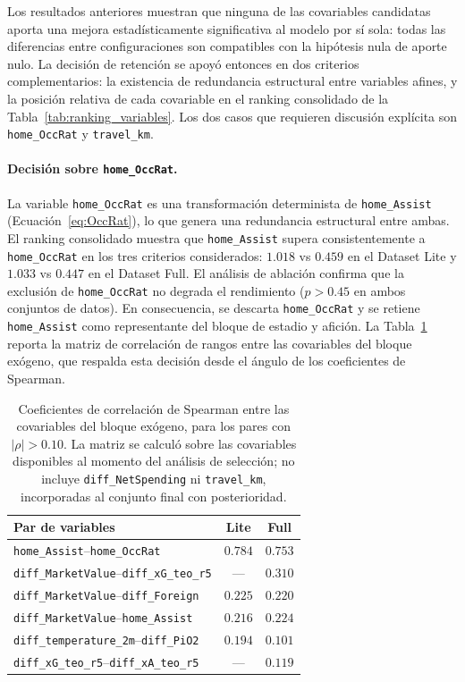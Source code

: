 Los resultados anteriores muestran que ninguna de las covariables candidatas aporta una mejora estad\'isticamente significativa al modelo por s\'i sola: todas las diferencias entre configuraciones son compatibles con la hip\'otesis nula de aporte nulo. La decisi\'on de retenci\'on se apoy\'o entonces en dos criterios complementarios: la existencia de redundancia estructural entre variables afines, y la posici\'on relativa de cada covariable en el ranking consolidado de la Tabla~\ref{tab:ranking_variables}. Los dos casos que requieren discusi\'on expl\'icita son \texttt{home\_OccRat} y \texttt{travel\_km}.

\paragraph{Decisi\'on sobre \texttt{home\_OccRat}.} La variable 
\texttt{home\_OccRat} es una transformaci\'on determinista de \texttt{home\_Assist} (Ecuaci\'on~\ref{eq:OccRat}), lo que genera una redundancia estructural entre ambas. El ranking consolidado muestra que \texttt{home\_Assist} supera consistentemente a \texttt{home\_OccRat} en los tres criterios considerados: $1{.}018$ vs $0{.}459$ en el Dataset Lite y $1{.}033$ vs $0{.}447$ en el Dataset Full. El an\'alisis de ablaci\'on confirma que la exclusi\'on de \texttt{home\_OccRat} no degrada el rendimiento ($p > 0.45$ en ambos conjuntos de datos). En consecuencia, se descarta \texttt{home\_OccRat} y se retiene \texttt{home\_Assist} como representante del bloque de estadio y afici\'on. La Tabla~\ref{tab:correlacion_spearman} reporta la matriz de correlaci\'on de rangos entre las covariables del bloque ex\'ogeno, que respalda esta decisi\'on desde el \'angulo de los coeficientes de Spearman.

\begin{table}[htbp]
	\centering
	\caption{Coeficientes de correlaci\'on de Spearman entre las covariables del bloque ex\'ogeno, para los pares con $|\rho| > 0{.}10$. La matriz se calcul\'o sobre las covariables disponibles al momento del an\'alisis de selecci\'on; no incluye \texttt{diff\_NetSpending} ni \texttt{travel\_km}, incorporadas al conjunto final con posterioridad.}
	\label{tab:correlacion_spearman}
	\begin{tabular}{lcc}
		\toprule
		\textbf{Par de variables} & \textbf{Lite} & \textbf{Full} \\
		\midrule
		\texttt{home\_Assist}--\texttt{home\_OccRat} & $0{.}784$ & $0{.}753$ \\
		\texttt{diff\_MarketValue}--\texttt{diff\_xG\_teo\_r5} & --- & $0{.}310$ \\
		\texttt{diff\_MarketValue}--\texttt{diff\_Foreign} & $0{.}225$ & $0{.}220$ \\
		\texttt{diff\_MarketValue}--\texttt{home\_Assist} & $0{.}216$ & $0{.}224$ \\
		\texttt{diff\_temperature\_2m}--\texttt{diff\_PiO2} & $0{.}194$ & $0{.}101$ \\
		\texttt{diff\_xG\_teo\_r5}--\texttt{diff\_xA\_teo\_r5} & --- & $0{.}119$ \\
		\bottomrule
	\end{tabular}
\end{table}

